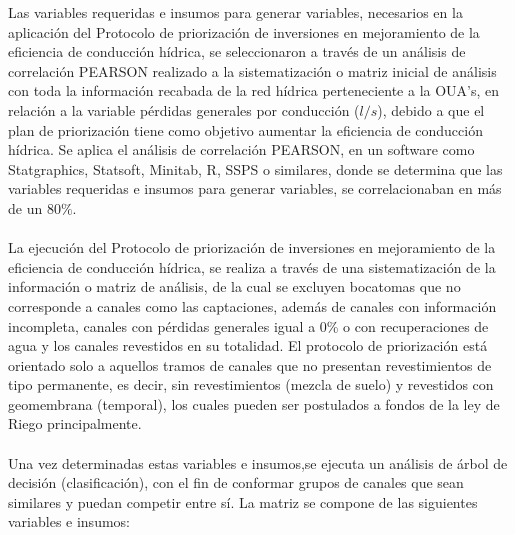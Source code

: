 \documentclass[]{article}
\begin{document}
Las variables requeridas e insumos para generar variables, necesarios en la aplicación del Protocolo de priorización de inversiones en mejoramiento de la eficiencia de conducción hídrica, se seleccionaron a través de un análisis de correlación PEARSON realizado a la sistematización o matriz inicial de análisis con toda la información recabada de la red hídrica perteneciente a la OUA's, en relación a la variable pérdidas generales por conducción ($l/s$), debido a que el plan de priorización tiene como objetivo aumentar la eficiencia de conducción hídrica. Se aplica el análisis de correlación PEARSON, en un software como Statgraphics, Statsoft, Minitab, R, SSPS o similares, donde se determina que las variables requeridas e insumos para generar variables, se correlacionaban en más de un 80$\%$.\\
\\
La ejecución del Protocolo de priorización de inversiones en mejoramiento de la eficiencia de conducción hídrica, se realiza a través de una sistematización de la información o matriz de análisis, de la cual se excluyen bocatomas que no corresponde a canales como las captaciones, además de canales con información incompleta, canales con pérdidas generales igual a 0\% o con recuperaciones de agua y los canales revestidos en su totalidad. El protocolo de priorización está orientado solo a aquellos tramos de canales que no presentan revestimientos de tipo permanente, es decir, sin revestimientos (mezcla de suelo) y revestidos con geomembrana (temporal), los cuales pueden ser postulados a fondos de la ley de Riego principalmente.\\
\\
Una vez determinadas estas variables e insumos,se ejecuta un análisis de árbol de decisión (clasificación), con el fin de conformar grupos de canales que sean similares y puedan competir entre sí. La matriz se compone de las siguientes variables e insumos:
\end{document}
